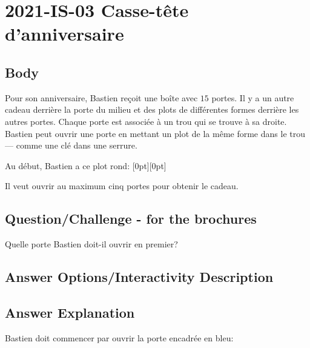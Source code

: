 \documentclass[a4paper,11pt]{report}
\newcommand{\taskGraphicsFolder}{..}
\begin{document}
\section*{\centering{} 2021-IS-03 Casse-tête d’anniversaire}


\subsection*{Body}

Pour son anniversaire, Bastien reçoit une boîte avec $15$ portes. Il y a un autre cadeau derrière la porte du milieu et des plots de différentes formes derrière les autres portes. Chaque porte est associée à un trou qui se trouve à sa droite. Bastien peut ouvrir une porte en mettant un plot de la même forme dans le trou — comme une clé dans une serrure.

{\centering%
\par}

Au début, Bastien a ce plot rond: \raisebox{-0.5ex}[0pt][0pt]{}

Il veut ouvrir au maximum cinq portes pour obtenir le cadeau.

{\em


\subsection*{Question/Challenge - for the brochures}

Quelle porte Bastien doit-il ouvrir en premier?

{\centering%
\par}

}

\begingroup
\renewcommand{\arraystretch}{1.5}
\subsection*{Answer Options/Interactivity Description}



\endgroup

\subsection*{Answer Explanation}

Bastien doit commencer par ouvrir la porte encadrée en bleu:
\end{document}
